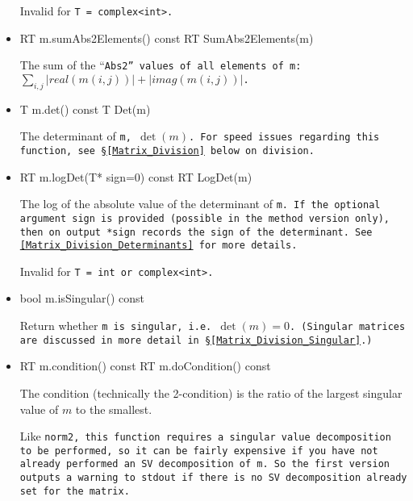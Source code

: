 \begin{itemize}
Invalid for \tt{T = complex<int>}.

\item
\begin{tmvcode}
RT m.sumAbs2Elements() const
RT SumAbs2Elements(m)
\end{tmvcode}
The sum of the ``\tt{Abs2}'' values of all elements of \tt{m}: $\sum_{i,j} |real(m(i,j))| + |imag(m(i,j))|$.

\item
\begin{tmvcode}
T m.det() const
T Det(m)
\end{tmvcode}
The determinant of \tt{m}, $\det(m)$.  For speed issues regarding this function, see 
\S\ref{Matrix_Division} below on division.

\item
\begin{tmvcode}
RT m.logDet(T* sign=0) const
RT LogDet(m)
\end{tmvcode}
The log of the absolute value of the determinant of \tt{m}.  If the optional argument \tt{sign} is 
provided (possible in the method version only), then on output \tt{*sign} records the sign of the determinant.  See \ref{Matrix_Division_Determinants} 
for more details.  

Invalid for \tt{T = int} or \tt{complex<int>}.

\item
\begin{tmvcode}
bool m.isSingular() const
\end{tmvcode}
Return whether \tt{m} is singular, i.e. $\det(m) = 0$.
(Singular matrices are discussed in more detail in \S\ref{Matrix_Division_Singular}.)

\item
\begin{tmvcode}
RT m.condition() const
RT m.doCondition() const
\end{tmvcode}
The condition (technically the 2-condition) is 
the ratio of the largest singular value of $m$ to the smallest.

Like \tt{norm2}, this function requires a singular value decomposition to be performed,
so it can be fairly expensive if you have not
already performed an SV decomposition of \tt{m}.
So the first version
outputs a warning to \tt{stdout} if there is no SV decomposition already set for the matrix.


\end{itemize}
